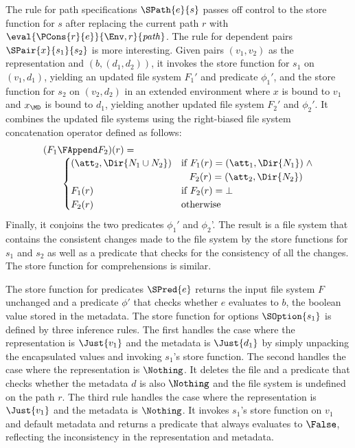 The rule for path specifications $\SPath{e}{s}$ passes off control to
the store function for $s$ after replacing the current path $r$ with
$\eval{\PCons{r}{e}}{\Env,r}{\mathit{path}}$. The rule for dependent
pairs $\SPair{x}{s_1}{s_2}$ is more interesting. Given pairs
$(v_1,v_2)$ as the representation and $(b,(d_1,d_2))$, it invokes the
store function for $s_1$ on $(v_1,d_1)$, yielding an updated file
system $F_1'$ and predicate $\phi_1'$, and the store function for
$s_2$ on $(v_2,d_2)$ in an extended environment where $x$ is bound to
$v_1$ and $x_{\MD}$ is bound to $d_1$, yielding another updated file
system $F_2'$ and $\phi_2'$. It combines the updated file systems
using the right-biased file system concatenation operator defined as
follows:
%
\[
\begin{array}{l}
(F_1 \FAppend F_2)(r) = \\
\qquad 
\begin{cases}
  (\att_2,\Dir{N_1 \cup N_2}) & \text{if}~F_1(r) = (\att_1,\Dir{N_1}) \; \wedge \\
                              & \;\;\; F_2(r) = (\att_2,\Dir{N_2})\\
  F_1(r) & \text{if}~F_2(r) = \bot\\
  F_2(r) & \text{otherwise}\\
\end{cases}
\end{array}
\]
%
Finally, it conjoins the two predicates $\phi_1'$ and $\phi_2$'. The
result is a file system that contains the consistent changes made to
the file system by the store functions for $s_1$ and $s_2$ as well as
a predicate that checks for the consistency of all the changes. The
store function for comprehensions is similar.

The store function for predicates $\SPred{e}$ returns the input file
system $F$ unchanged and a predicate $\phi'$ that checks whether $e$
evaluates to $b$, the boolean value stored in the metadata. The store
function for options $\SOption{s_1}$ is defined by three inference
rules. The first handles the case where the representation is
$\Just{v_1}$ and the metadata is $\Just{d_1}$ by simply unpacking the
encapsulated values and invoking $s_1$'s store function. The second
handles the case where the representation is $\Nothing$. It deletes
the file and a predicate that checks whether the metadata $d$ is also
$\Nothing$ and the file system is undefined on the path $r$. The third
rule handles the case where the representation is $\Just{v_1}$ and the
metadata is $\Nothing$. It invokes $s_1$'s store function on $v_1$ and
default metadata and returns a predicate that always evaluates to
$\False$, reflecting the inconsistency in the representation and
metadata.

